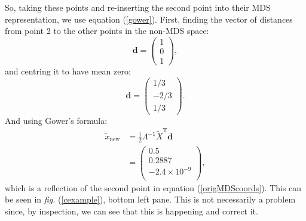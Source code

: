 \documentclass[a4paper,10pt]{article}
\newcommand{\fig}[1]{\emph{fig.} (\ref{#1})}
\newcommand{\tr}[1]{#1^{\text{T}}}
\newcommand{\cross}{\times}
\begin{document}
So, taking these points and re-inserting the second point into their MDS representation, we use equation (\ref{gower}). First, finding the vector of distances from point 2 to the other points in the non-MDS space:
\begin{equation*}
\mathbf{d}=\begin{pmatrix} 
	1\\
	0\\ 
	1
	\end{pmatrix},
\end{equation*}
and centring it to have mean zero:
\begin{equation*}
\mathbf{d}=\begin{pmatrix} 
	1/3\\
	-2/3\\ 
	1/3
	\end{pmatrix}.
\end{equation*}
And using Gower's formula:
\begin{equation*}
\begin{aligned}
\tilde{x}_{\text{new}} &= \frac{1}{2} \Lambda^{-1} \tr{\tilde{X}} \mathbf{d}\\
&=\begin{pmatrix}
0.5\\
0.2887\\
-2.4 \cross 10^{-9}\\
\end{pmatrix},
\end{aligned}
\end{equation*}
which is a reflection of the second point in equation (\ref{origMDScoords}). This can be seen in \fig{cexample}, bottom left pane. This is not necessarily a problem since, by inspection, we can see that this is happening and correct it.
\end{document}
